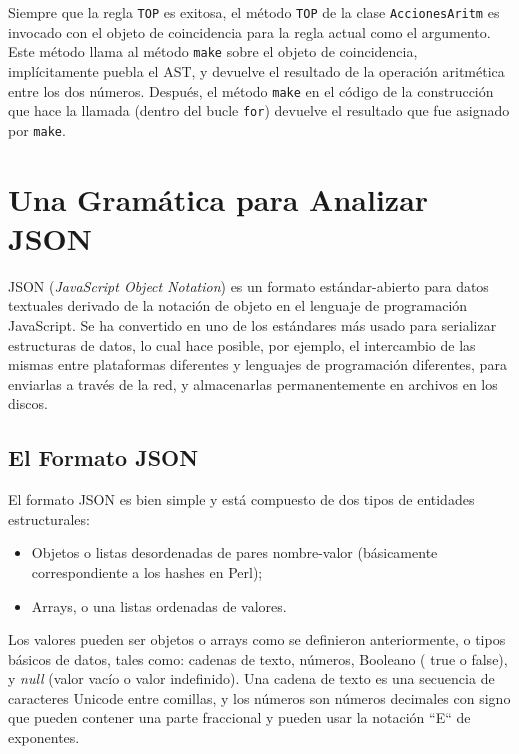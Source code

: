 
Siempre que la regla {\tt TOP} es exitosa, el método {\tt TOP}
de la clase {\tt AccionesAritm} es invocado con el objeto de
coincidencia para la regla actual como el argumento. Este método
llama al método {\tt make} sobre el objeto de coincidencia, 
implícitamente puebla el AST, y devuelve el resultado de la
operación aritmética entre los dos números. Después, el método
{\tt make} en el código de la construcción que hace la llamada 
(dentro del bucle {\tt for}) devuelve el resultado que fue asignado
por {\tt make}.

\section{Una Gramática para Analizar JSON}

JSON (\emph{JavaScript Object Notation}) es un formato 
estándar-abierto para datos textuales derivado de la
notación de objeto en el lenguaje de programación JavaScript.
Se ha convertido en uno de los estándares más usado para
serializar estructuras de datos, lo cual hace posible, por
ejemplo, el intercambio de las mismas entre plataformas diferentes
y lenguajes de programación diferentes, para enviarlas a través 
de la red, y almacenarlas permanentemente en archivos en los
discos.

\subsection{El Formato JSON}

El formato JSON es bien simple y está compuesto de dos tipos
de entidades estructurales:
\begin{itemize}
\item Objetos o listas desordenadas de pares nombre-valor
(básicamente correspondiente a los hashes en Perl);
\item Arrays, o una listas ordenadas de valores.
\end{itemize}

Los valores pueden ser objetos o arrays como se definieron anteriormente,
o tipos básicos de datos, tales como: cadenas de texto, números, Booleano (
true o false), y \emph{null} (valor vacío o valor indefinido).
Una cadena de texto es una secuencia de caracteres Unicode entre 
comillas, y los números son números decimales con signo que pueden contener
una parte fraccional y pueden usar la notación ``E`` de exponentes.


